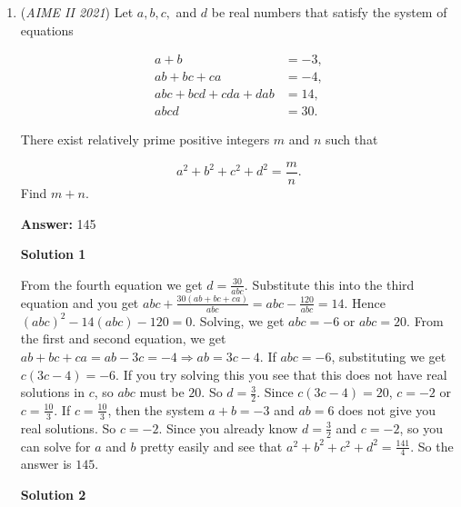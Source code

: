 \begin{enumerate}
 Therefore, the number of possible pairs of sets $(A, B)$ is

 
 \[\sum_{k=0}^{5} 2^n {5 \choose n}\]

 We can compute this manually since it's only from $k=0$ to $5$, and computing gives us $243$. We can double this result for $B \subseteq A$, and we get $2(243) = 486$.

 However, we have double counted the cases where $A$ and $B$ are the same sets. There are $32$ possible such cases, so we subtract $32$ from $486$ to get $\boxed{454}$.

 


	\item (\textit{AIME II 2021}) Let $a, b, c,$ and $d$ be real numbers that satisfy the system of equations

 \begin{align*} a + b &= -3, \\ ab + bc + ca &= -4, \\ abc + bcd + cda + dab &= 14, \\ abcd &= 30. \end{align*}

There exist relatively prime positive integers $m$ and $n$ such that

 \[a^2 + b^2 + c^2 + d^2 = \frac{m}{n}.\]Find $m + n$.


 
 \textbf{Answer: }145



\textbf{Solution 1}

From the fourth equation we get $d=\frac{30}{abc}.$ Substitute this into the third equation and you get $abc + \frac{30(ab + bc + ca)}{abc} = abc - \frac{120}{abc} = 14$. Hence $(abc)^2 - 14(abc)-120 = 0$. Solving, we get $abc = -6$ or $abc = 20$. From the first and second equation, we get $ab + bc + ca = ab-3c = -4 \Longrightarrow ab = 3c-4$. If $abc=-6$, substituting we get $c(3c-4)=-6$. If you try solving this you see that this does not have real solutions in $c$, so $abc$ must be $20$. So $d=\frac{3}{2}$. Since $c(3c-4)=20$, $c=-2$ or $c=\frac{10}{3}$. If $c=\frac{10}{3}$, then the system $a+b=-3$ and $ab = 6$ does not give you real solutions. So $c=-2$. Since you already know $d=\frac{3}{2}$ and $c=-2$, so you can solve for $a$ and $b$ pretty easily and see that $a^{2}+b^{2}+c^{2}+d^{2}=\frac{141}{4}$. So the answer is $\boxed{145}$.

 



\textbf{Solution 2}


\end{enumerate}
